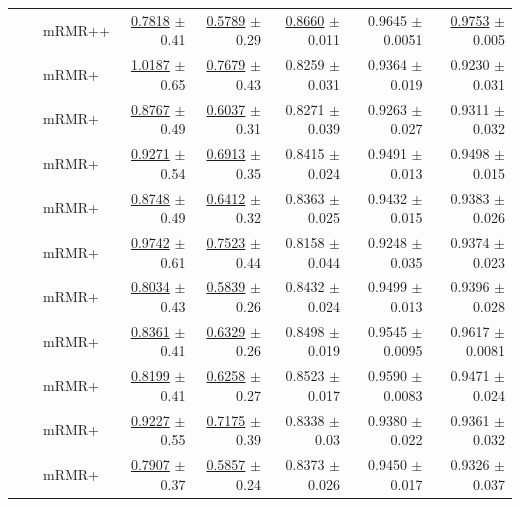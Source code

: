 \begin{longtable}{llp{}rrrrr}
 &  & mRMR++ & \underline{0.7818} {\scriptsize $\pm$ 0.41} & \underline{0.5789} {\scriptsize $\pm$ 0.29} & \underline{0.8660} {\scriptsize $\pm$ 0.011} & 0.9645 {\scriptsize $\pm$ 0.0051} & \underline{0.9753} {\scriptsize $\pm$ 0.005} \\
 &  & mRMR+ & \underline{1.0187} {\scriptsize $\pm$ 0.65} & \underline{0.7679} {\scriptsize $\pm$ 0.43} & 0.8259 {\scriptsize $\pm$ 0.031} & 0.9364 {\scriptsize $\pm$ 0.019} & 0.9230 {\scriptsize $\pm$ 0.031} \\
 &  & mRMR+ & \underline{0.8767} {\scriptsize $\pm$ 0.49} & \underline{0.6037} {\scriptsize $\pm$ 0.31} & 0.8271 {\scriptsize $\pm$ 0.039} & 0.9263 {\scriptsize $\pm$ 0.027} & 0.9311 {\scriptsize $\pm$ 0.032} \\
 &  & mRMR+ & \underline{0.9271} {\scriptsize $\pm$ 0.54} & \underline{0.6913} {\scriptsize $\pm$ 0.35} & 0.8415 {\scriptsize $\pm$ 0.024} & 0.9491 {\scriptsize $\pm$ 0.013} & 0.9498 {\scriptsize $\pm$ 0.015} \\
 &  & mRMR+ & \underline{0.8748} {\scriptsize $\pm$ 0.49} & \underline{0.6412} {\scriptsize $\pm$ 0.32} & 0.8363 {\scriptsize $\pm$ 0.025} & 0.9432 {\scriptsize $\pm$ 0.015} & 0.9383 {\scriptsize $\pm$ 0.026} \\
 &  & mRMR+ & \underline{0.9742} {\scriptsize $\pm$ 0.61} & \underline{0.7523} {\scriptsize $\pm$ 0.44} & 0.8158 {\scriptsize $\pm$ 0.044} & 0.9248 {\scriptsize $\pm$ 0.035} & 0.9374 {\scriptsize $\pm$ 0.023} \\
 &  & mRMR+ & \underline{0.8034} {\scriptsize $\pm$ 0.43} & \underline{0.5839} {\scriptsize $\pm$ 0.26} & 0.8432 {\scriptsize $\pm$ 0.024} & 0.9499 {\scriptsize $\pm$ 0.013} & 0.9396 {\scriptsize $\pm$ 0.028} \\
 &  & mRMR+ & \underline{0.8361} {\scriptsize $\pm$ 0.41} & \underline{0.6329} {\scriptsize $\pm$ 0.26} & 0.8498 {\scriptsize $\pm$ 0.019} & 0.9545 {\scriptsize $\pm$ 0.0095} & 0.9617 {\scriptsize $\pm$ 0.0081} \\
 &  & mRMR+ & \underline{0.8199} {\scriptsize $\pm$ 0.41} & \underline{0.6258} {\scriptsize $\pm$ 0.27} & 0.8523 {\scriptsize $\pm$ 0.017} & 0.9590 {\scriptsize $\pm$ 0.0083} & 0.9471 {\scriptsize $\pm$ 0.024} \\
 &  & mRMR+ & \underline{0.9227} {\scriptsize $\pm$ 0.55} & \underline{0.7175} {\scriptsize $\pm$ 0.39} & 0.8338 {\scriptsize $\pm$ 0.03} & 0.9380 {\scriptsize $\pm$ 0.022} & 0.9361 {\scriptsize $\pm$ 0.032} \\
 &  & mRMR+ & \underline{0.7907} {\scriptsize $\pm$ 0.37} & \underline{0.5857} {\scriptsize $\pm$ 0.24} & 0.8373 {\scriptsize $\pm$ 0.026} & 0.9450 {\scriptsize $\pm$ 0.017} & 0.9326 {\scriptsize $\pm$ 0.037} \\

\end{longtable}
